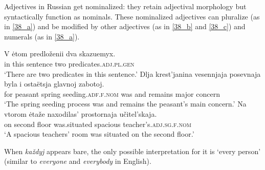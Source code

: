 \documentclass[output=paper,
colorlinks,
citecolor=brown,
newtxmath
]{langscibook}
\begin{document}

\ea\label{krasnyetufli} 
\z\ex\label{molodyjeljudi}
\z\z

\noindent Adjectives in Russian get nominalized: they retain adjectival morphology but syntactically function as nominals. These nominalized adjectives can pluralize (as in \ref{38_a}) and be modified by other adjectives (as in \ref{38_b} and \ref{38_c}) and numerals (as in \ref{38_a}).


\ea\label{38_a}
    \ea \gll V ėtom predloženii dva skazuemyx.\\
    in this sentence two predicates.\textsc{adj.pl.gen}\\
    \glt `There are two predicates in this sentence.'
    \ex\label{38_b} \gll Dlja krest'janina vesennjaja posevnaja byla i ostaëtsja glavnoj zabotoj.\\
    for peasant spring seeding.\textsc{adf.f.nom} was and remains major concern\\
    \glt `The spring seeding process was and remains the peasant's main concern.'
    \ex\label{38_c} \gll Na vtorom ėtaže naxodilas' prostornaja učitel'skaja.\\
    on second floor {was.situated} spacious teacher's.\textsc{adj.sg.f.nom}\\
    \glt `A spacious teachers' room was situated on the second floor.'
\z\z 

\noindent When \textit{každyj} appears bare, the only possible interpretation for it is `every person' (similar to \textit{everyone} and \textit{everybody} in English). 
\end{document}
